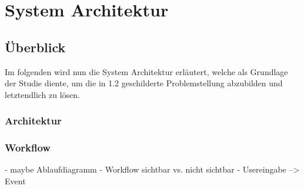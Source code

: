 \chapter{System Architektur}
\label{kap:Kapitel03}

\section{Überblick}

Im folgenden wird nun die System Architektur erläutert, welche als Grundlage der Studie diente, um die in 1.2 geschilderte Problemstellung abzubilden und letztendlich zu lösen. 

\subsection{Architektur}
\subsection{Workflow}
- maybe Ablaufdiagramm 
- Workflow sichtbar vs. nicht sichtbar
- Usereingabe --> Event 
